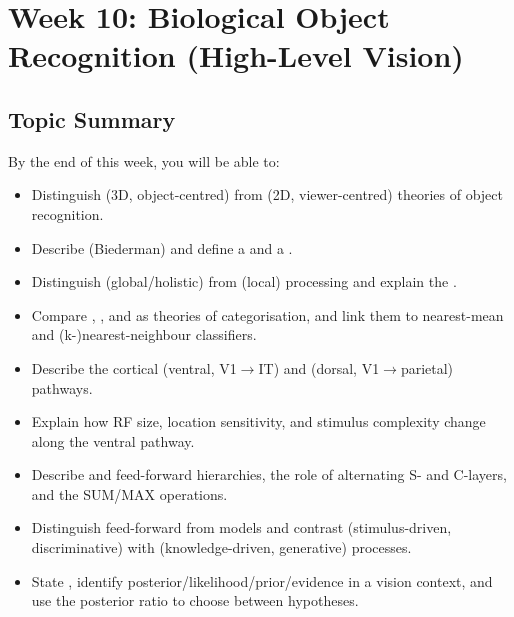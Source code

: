 \section{Week 10: Biological Object Recognition (High-Level Vision)}

\subsection{Topic Summary}

\begin{keybox}
By the end of this week, you will be able to:
\begin{itemize}
  \item Distinguish  (3D, object-centred) from  (2D, viewer-centred) theories of object recognition.
  \item Describe  (Biederman) and define a  and a .
  \item Distinguish  (global/holistic) from  (local) processing and explain the .
  \item Compare , , and  as theories of categorisation, and link them to nearest-mean and (k-)nearest-neighbour classifiers.
  \item Describe the cortical  (ventral, V1$\rightarrow$IT) and  (dorsal, V1$\rightarrow$parietal) pathways.
  \item Explain how RF size, location sensitivity, and stimulus complexity change along the ventral pathway.
  \item Describe  and  feed-forward hierarchies, the role of alternating S- and C-layers, and the SUM/MAX operations.
  \item Distinguish feed-forward from  models and contrast  (stimulus-driven, discriminative) with  (knowledge-driven, generative) processes.
  \item State , identify posterior/likelihood/prior/evidence in a vision context, and use the posterior ratio to choose between hypotheses.
\end{itemize}
\end{keybox}

